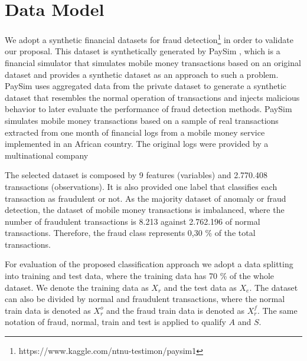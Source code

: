 \section{Data Model}
\label{sec:4_datamodel}


We adopt a synthetic financial datasets for fraud detection\footnote{https://www.kaggle.com/ntnu-testimon/paysim1} in order to validate our proposal. This dataset is synthetically generated by  PaySim \cite{lopez2016paysim}, which is a financial simulator that simulates mobile money transactions based on an original dataset and provides a synthetic dataset as an approach to such a problem. PaySim uses aggregated data from the private dataset to generate a synthetic dataset that resembles the normal operation of transactions and injects malicious behavior to later evaluate the performance of fraud detection methods. PaySim simulates mobile money transactions based on a sample of real transactions extracted from one month of financial logs from a mobile money service implemented in an African country. The original logs were provided by a multinational company

The selected dataset is composed by 9 features (variables) and 2.770.408 transactions (observations). It is also provided one label that classifies each transaction as fraudulent or not. As the majority dataset of anomaly or fraud detection, the dataset of mobile money transactions is imbalanced, where the number of fraudulent transactions is 8.213 against 2.762.196 of normal transactions. Therefore, the fraud class represents 0,30 \% of the total transactions. 

For evaluation of the proposed classification approach we adopt a data splitting into training and test data, where the training data has 70 \% of the whole dataset. We denote the training data as $X_r$ and the test data as $X_e$. The dataset can also be divided by normal and fraudulent transactions, where the normal train data is denoted as $X_r^o$ and the fraud train data is denoted as $X_r^f$. The same notation of fraud, normal, train and test is applied to qualify $A$ and $S$.


